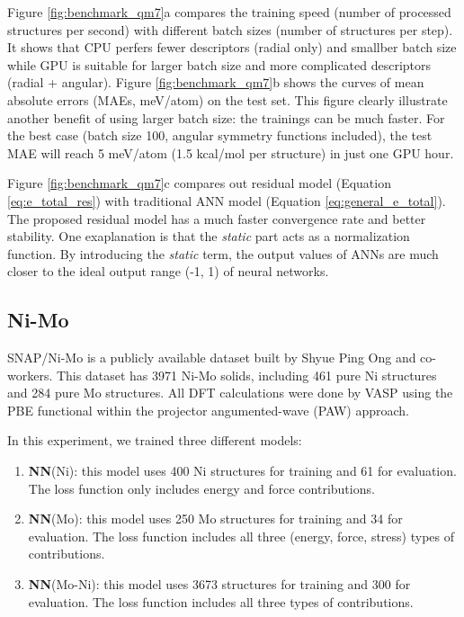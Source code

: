 \documentclass[final,1p,times]{elsarticle}
\begin{document}
Figure \ref{fig:benchmark_qm7}a compares the training speed (number of processed 
structures per second) with different batch sizes (number of structures per 
step). It shows that CPU perfers fewer descriptors (radial only) and smallber 
batch size while GPU is suitable for larger batch size and more complicated 
descriptors (radial + angular). 
Figure \ref{fig:benchmark_qm7}b shows the curves of mean absolute errors 
(MAEs, meV/atom) on the test set. This figure clearly illustrate another benefit 
of using larger batch size: the trainings can be much faster. For the best case 
(batch size 100, angular symmetry functions included), the test MAE will reach 5 
meV/atom (1.5 kcal/mol per structure) in just one GPU hour. 

Figure \ref{fig:benchmark_qm7}c compares out residual model (Equation 
\ref{eq:e_total_res}) with traditional ANN model (Equation 
\ref{eq:general_e_total}). The proposed residual model has a much faster 
convergence rate and better stability. One exaplanation is that the 
\textit{static} part acts as a normalization function. By introducing the 
\textit{static} term, the output values of ANNs are much closer to the ideal 
output range (-1, 1) of neural networks.

% 
%
\subsection{Ni-Mo}

SNAP/Ni-Mo\cite{SNAP_Mo_2017, SNAP_2018} is a publicly available dataset built 
by Shyue Ping Ong and co-workers. This dataset has 3971 Ni-Mo solids, including 
461 pure Ni structures and 284 pure Mo structures. All DFT calculations were 
done by VASP\cite{VASP} using the PBE\cite{PBE} functional within the projector 
angumented-wave (PAW)\cite{PAW} approach.

In this experiment, we trained three different models:
\begin{enumerate}
    
    \item \textbf{NN}(Ni): this model uses 400 Ni structures for training and 61 
    for evaluation. The loss function only includes energy and force 
    contributions.
    
    \item \textbf{NN}(Mo): this model uses 250 Mo structures for training and 34 
    for evaluation. The loss function includes all three (energy, force, stress) 
    types of contributions. 
    
    \item \textbf{NN}(Mo-Ni): this model uses 3673 structures for training and 
    300 for evaluation. The loss function includes all three types of 
    contributions.

\end{enumerate}
\end{document}

